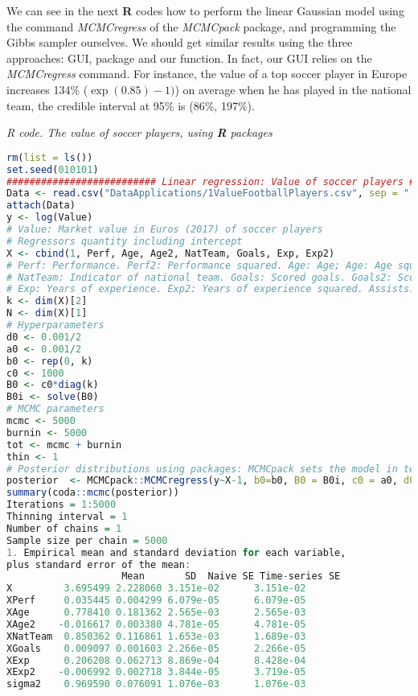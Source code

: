 We can see in the next \textbf{R} codes how to perform the linear Gaussian model using the command \textit{MCMCregress} of the \textit{MCMCpack} package, and programming the Gibbs sampler ourselves. We should get similar results using the three approaches: GUI, package and our function. In fact, our GUI relies on the \textit{MCMCregress} command. For instance, the value of a top soccer player in Europe increases 134\% ($\exp(0.85)-1)$) on average when he has played in the national team, the credible interval at 95\% is (86\%, 197\%).  


\begin{tcolorbox}[enhanced,width=4.67in,center upper,
	fontupper=\large\bfseries,drop shadow southwest,sharp corners]\label{code1}
	\textit{R code. The value of soccer players, using \textbf{R} packages}
	\begin{VF}
		\begin{lstlisting}[language=R]		
rm(list = ls())
set.seed(010101)
########################## Linear regression: Value of soccer players ##########################
Data <- read.csv("DataApplications/1ValueFootballPlayers.csv", sep = ",", header = TRUE, fileEncoding = "latin1")
attach(Data)
y <- log(Value) 
# Value: Market value in Euros (2017) of soccer players
# Regressors quantity including intercept
X <- cbind(1, Perf, Age, Age2, NatTeam, Goals, Exp, Exp2)
# Perf: Performance. Perf2: Performance squared. Age: Age; Age: Age squared. 
# NatTeam: Indicator of national team. Goals: Scored goals. Goals2: Scored goals squared
# Exp: Years of experience. Exp2: Years of experience squared. Assists: Number of assists
k <- dim(X)[2]
N <- dim(X)[1]
# Hyperparameters
d0 <- 0.001/2
a0 <- 0.001/2
b0 <- rep(0, k)
c0 <- 1000
B0 <- c0*diag(k)
B0i <- solve(B0)
# MCMC parameters
mcmc <- 5000
burnin <- 5000
tot <- mcmc + burnin
thin <- 1
# Posterior distributions using packages: MCMCpack sets the model in terms of the precision matrix
posterior  <- MCMCpack::MCMCregress(y~X-1, b0=b0, B0 = B0i, c0 = a0, d0 = d0, burnin = burnin, mcmc = mcmc, thin = thin)
summary(coda::mcmc(posterior))
Iterations = 1:5000
Thinning interval = 1 
Number of chains = 1 
Sample size per chain = 5000 
1. Empirical mean and standard deviation for each variable,
plus standard error of the mean:
					Mean       SD  Naive SE Time-series SE
X         3.695499 2.228060 3.151e-02      3.151e-02
XPerf     0.035445 0.004299 6.079e-05      6.079e-05
XAge      0.778410 0.181362 2.565e-03      2.565e-03
XAge2    -0.016617 0.003380 4.781e-05      4.781e-05
XNatTeam  0.850362 0.116861 1.653e-03      1.689e-03
XGoals    0.009097 0.001603 2.266e-05      2.266e-05
XExp      0.206208 0.062713 8.869e-04      8.428e-04
XExp2    -0.006992 0.002718 3.844e-05      3.719e-05
sigma2    0.969590 0.076091 1.076e-03      1.076e-03
\end{lstlisting}
	\end{VF}
\end{tcolorbox} 

